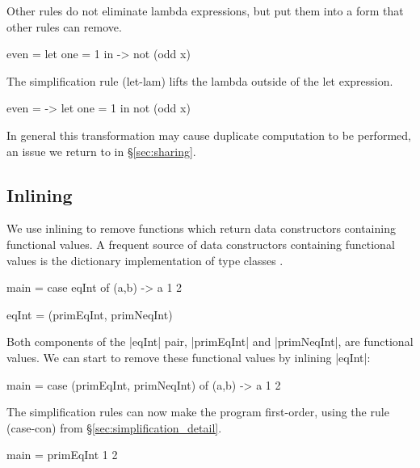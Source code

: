 \documentclass{sigplanconf}
\begin{document}
\noindent Other rules do not eliminate lambda expressions, but put them into a form that other rules can remove.

\begin{example}
\begin{code}
even =  let  one = 1
        in   \x -> not (odd x)
\end{code}

\noindent The simplification rule (let-lam) lifts the lambda outside of the let expression.

\begin{code}
even = \x ->  let  one = 1
              in   not (odd x)
\end{code}

\noindent In general this transformation may cause duplicate computation to be performed, an issue we return to in \S\ref{sec:sharing}.
\end{example}


\subsection{Inlining}

We use inlining to remove functions which return data constructors containing functional values. A frequent source of data constructors containing functional values is the dictionary implementation of type classes \cite{wadler:type_classes}.

\begin{example}
\begin{code}
main = case  eqInt of
             (a,b) -> a 1 2

eqInt = (primEqInt, primNeqInt)
\end{code}

Both components of the |eqInt| pair, |primEqInt| and |primNeqInt|, are functional values. We can start to remove these functional values by inlining |eqInt|:

\begin{code}
main = case  (primEqInt, primNeqInt) of
             (a,b) -> a 1 2
\end{code}

\noindent The simplification rules can now make the program first-order, using the rule (case-con) from \S\ref{sec:simplification_detail}.

\begin{code}
main = primEqInt 1 2
\end{code}\codeexample
\end{example}
\end{document}

